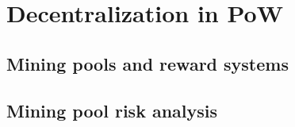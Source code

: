 \section{Decentralization in PoW}\label{sec:decentralization_pow}
\subsection{Mining pools and reward systems}
\subsection{Mining pool risk analysis}

\newpage